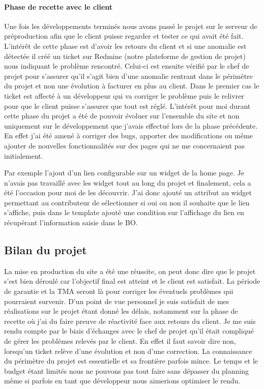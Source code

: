 \documentclass[a4paper,11pt,twoside]{report}
\begin{document}
	\paragraph*{Phase de recette avec le client}
	Une fois les développements terminés nous avons passé le projet sur le serveur de préproduction afin que le client puisse regarder et tester ce qui avait été fait. L'intérêt de cette phase est d'avoir les retours du client et si une anomalie est détectée il créé un ticket sur Redmine (notre plateforme de gestion de projet) nous indiquant le problème rencontré. Celui-ci est ensuite vérifié par le chef de projet pour s'assurer qu'il s'agit bien d'une anomalie rentrant dans le périmètre du projet et non une évolution à facturer en plus au client. Dans le premier cas le ticket est affecté à un développeur qui va corriger le problème puis le relivrer pour que le client puisse s'assurer que tout est réglé. 
	L'intérêt pour moi durant cette phase du projet a été de pouvoir évoluer sur l'ensemble du site et non uniquement sur le développement que j'avais effectué lors de la phase précédente. En effet j'ai été amené à corriger des bugs, apporter des modifications ou même ajouter de nouvelles fonctionnalités sur des pages qui ne me concernaient pas initialement. 
	
	Par exemple l'ajout d'un lien configurable sur un widget de la home page. Je n'avais pas travaillé avec les widget tout au long du projet et finalement, cela a été l'occasion pour moi de les découvrir. J'ai donc ajouté un attribut au widget permettant au contributeur de sélectionner si oui ou non il souhaite que le lien s'affiche, puis dans le template ajouté une condition sur l'affichage du lien en récupérant l'information saisie dans le BO.  
    \subsection*{Bilan du projet}
    La mise en production du site a été une réussite, on peut donc dire que le projet s'est bien déroulé car l'objectif final est atteint et le client est satisfait. La période de garantie et la TMA seront là pour corriger les éventuels problèmes qui pourraient survenir. D'un point de vue personnel je suis satisfait de mes réalisations sur le projet étant donné les délais, notamment sur la phase de recette où j'ai du faire preuve de réactivité face aux retours du client. Je me suis rendu compte par le biais d'échanges avec le chef de projet qu'il était compliqué de gérer les problèmes relevés par le client. En effet il faut savoir dire non, lorsqu'un ticket relève d'une évolution et non d'une correction. La connaissance du périmètre du projet est essentielle et sa frontière parfois mince. Le temps et le budget étant limités nous ne pouvons pas tout faire sans dépasser du planning même si parfois en tant que développeur nous aimerions optimiser le rendu.
    
\end{document}
